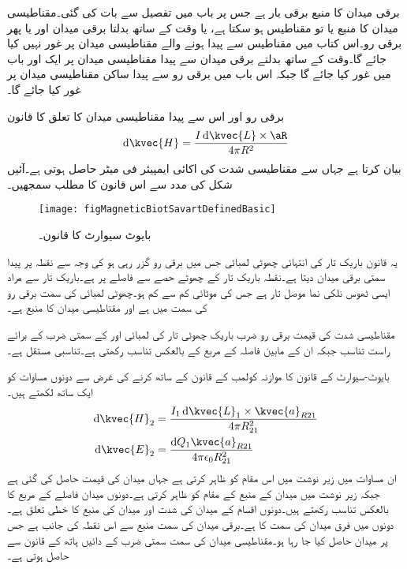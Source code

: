برقی میدان کا منبع برقی بار ہے جس پر باب  میں تفصیل سے بات کی گئی۔مقناطیسی میدان کا منبع یا تو مقناطیس ہو سکتا ہے، یا وقت کے ساتھ بدلتا برقی میدان اور یا پھر برقی رو۔اس کتاب میں مقناطیس سے پیدا ہونے والے مقناطیسی میدان پر غور نہیں کیا جائے گا۔وقت کے ساتھ بدلتے برقی میدان سے پیدا مقناطیسی میدان پر ایک اور باب میں غور کیا جائے گا جبکہ اس باب میں برقی رو سے پیدا ساکن مقناطیسی میدان پر غور کیا جائے گا۔

برقی رو اور اس سے پیدا مقناطیسی میدان کا تعلق  کا قانون
\begin{align}\label{مساوات_بایوٹ_سیوارٹ_تفرق_شکل}
\dif \kvec{H}=\frac{I \dif \kvec{L} \times \aR}{4 \pi R^2}
\end{align}
 بیان کرتا ہے جہاں سے مقناطیسی شدت  کی اکائی ایمپیئر فی میٹر  حاصل ہوتی ہے۔آئیں شکل  کی مدد سے  اس قانون کا مطلب سمجھیں۔

\begin{figure}
\centering
\texttt{[image: figMagneticBiotSavartDefinedBasic]}
\caption{بایوٹ سیوارٹ کا قانون۔}
\label{شکل_مقناطیسی_بایوٹ_سیوارٹ_قانون}
\end{figure}
یہ قانون باریک تار کی انتہائی چھوٹی لمبائی  جس میں  برقی رو  گزر رہی ہو کی وجہ  سے  نقطہ  پر پیدا سمتی برقی میدان  دیتا ہے۔نقطہ  باریک تار کے چھوٹے حصے سے  فاصلے پر ہے۔باریک تار سے مراد ایسی ٹھوس نلکی نما موصل تار ہے جس کی موٹائی کم سے کم ہو۔چھوٹی لمبائی  کی سمت برقی رو کی سمت میں ہے اور   مقناطیسی میدان کا منبع ہے۔

مقناطیسی شدت کی قیمت برقی رو ضرب باریک چھوٹی تار کی لمبائی  اور  کے سمتی ضرب کے برائے راست تناسب جبکہ ان کے مابین فاصلہ  کے مربع کے بالعکس تناسب رکھتی ہے۔تناسبی مستقل  ہے۔

بایوٹ-سیوارٹ کے  قانون کا موازنہ کولمب کے قانون کے ساتھ کرنے کی غرض سے دونوں مساوات کو ایک ساتھ لکھتے ہیں۔
\begin{gather}
\begin{aligned}\label{مساوات_بایوٹ_سیوارٹ_تفرق_شکل_ب}
\dif \kvec{H}_2&=\frac{I_1 \dif \kvec{L}_1 \times \kvec{a}_{R21}}{4 \pi R_{21}^2}\\
\dif \kvec{E}_2&=\frac{\dif Q_1 \kvec{a}_{R21}}{4\pi \epsilon_0 R_{21}^2}
\end{aligned}
\end{gather}
ان مساوات میں زیر نوشت میں  اس مقام کو ظاہر کرتی ہے جہاں میدان کی قیمت حاصل کی گئی ہے جبکہ زیر نوشت میں  میدان کے منبع کے مقام کو ظاہر کرتی ہے۔دونوں میدان فاصلے کے مربع کا بالعکس تناسب رکھتے ہیں۔دونوں اقسام کے میدان کی شدت اور میدان کی منبع کا خطی تعلق ہے۔دونوں میں فرق میدان کی سمت کا ہے۔برقی میدان کی سمت منبع سے اس نقطہ کی جانب ہے جس پر میدان حاصل کیا جا رہا ہو۔مقناطیسی میدان کی سمت سمتی ضرب کے دائیں ہاتھ کے قانون سے حاصل ہوتی ہے۔

